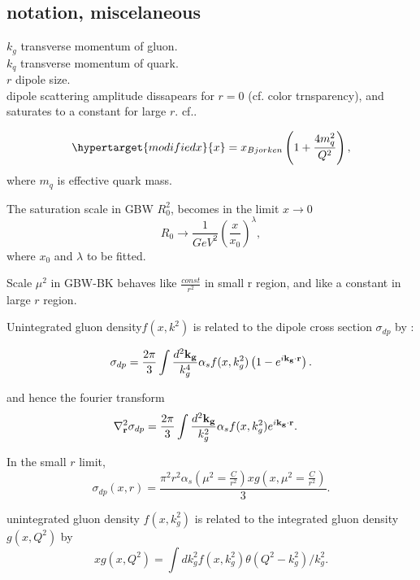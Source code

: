 \subsection{notation, miscelaneous}

$k_g$ transverse momentum of gluon.\\
$k_q$ transverse momentum of quark.\\
$r$  dipole size.\\
dipole scattering amplitude dissapears
 for $r=0$ (cf. color trnsparency), and saturates to a constant for large $r$. cf.\cite{gbw1998}.



\begin{equation}
\hypertarget{modifiedx}{x}=x_{Bjorken}\left(1+\frac{4m^2_q}{Q^2}\right),
\end{equation}
where $m_q$ is effective quark mass. 



The saturation scale in GBW \hypertarget{saturationscaleGBW}{$R^2_0$}, becomes in the limit $x\rightarrow 0$
\begin{equation}
R_0\rightarrow \frac{1}{GeV^2}\left(\frac{x}{x_0}\right)^\lambda,
\end{equation}
where $x_0$ and $\lambda$ to be fitted.

Scale $\mu^2$ in GBW-BK behaves like $\frac{const}{r^2}$ in small r region, and like a constant in large $r$ region.

Unintegrated gluon density\hypertarget{ugd}{$f(x,k^2)$} is related to the dipole cross section $\sigma_{dp}$ by%
\cite{gbk2002, nikolaev1994, nikolaev2001}:

\begin{equation}
\sigma_{dp}=\frac{2 \pi}{3} \int\frac{d^2 \mathbf{k_g}}{k_g^4} \alpha_s f(x,k_g^2) \left(1-e^{i \mathbf{k_g}\cdot\mathbf{r}}\right).
\end{equation}

and hence the fourier transform
\begin{align}
\nabla^2_{\mathbf{r}} \sigma_{dp}&=\frac{2 \pi}{3} \int\frac{d^2 \mathbf{k_g}}{k_g^2} \alpha_s f(x,k_g^2)  e^{i \mathbf{k_g}\cdot\mathbf{r}}.
\end{align}

In the small $r$ limit\cite{nikolaev2001}, 
\begin{equation}
\sigma_{dp}(x,r)=\frac{\pi^2 r^2\alpha_s(\mu^2=\frac{C}{r^2}) x g(x,\mu^2=\frac{C}{r^2})}{3}.
\end{equation}

unintegrated gluon density $f(x,k_g^2)$ is related to the integrated gluon density $g(x,Q^2)$ by 
 \begin{equation}
x g (x,Q^2)=\int d k_g^2 f(x,k_g^2) \theta(Q^2-k_g^2)/k_g^2.
\end{equation}
